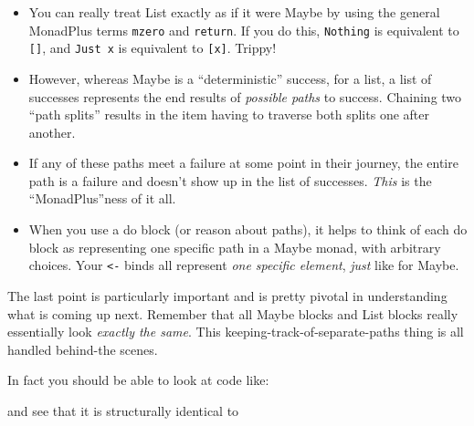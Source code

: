 \documentclass[]{article}
\newenvironment{Shaded}{}{}
\newcommand{\KeywordTok}[1]{\textcolor[rgb]{0.00,0.44,0.13}{\textbf{{#1}}}}
\newcommand{\DecValTok}[1]{\textcolor[rgb]{0.25,0.63,0.44}{{#1}}}
\newcommand{\OtherTok}[1]{\textcolor[rgb]{0.00,0.44,0.13}{{#1}}}
\newcommand{\FunctionTok}[1]{\textcolor[rgb]{0.02,0.16,0.49}{{#1}}}
\newcommand{\NormalTok}[1]{{#1}}
\begin{document}
\begin{itemize}
\tightlist
\item
  You can really treat List exactly as if it were Maybe by using the general MonadPlus terms
  \texttt{mzero} and \texttt{return}. If you do this, \texttt{Nothing} is equivalent to
  \texttt{{[}{]}}, and \texttt{Just\ x} is equivalent to \texttt{{[}x{]}}. Trippy!
\item
  However, whereas Maybe is a ``deterministic'' success, for a list, a list of successes represents
  the end results of \emph{possible paths} to success. Chaining two ``path splits'' results in the
  item having to traverse both splits one after another.
\item
  If any of these paths meet a failure at some point in their journey, the entire path is a failure
  and doesn't show up in the list of successes. \emph{This} is the ``MonadPlus''ness of it all.
\item
  When you use a do block (or reason about paths), it helps to think of each do block as
  representing one specific path in a Maybe monad, with arbitrary choices. Your
  \texttt{\textless{}-} binds all represent \emph{one specific element}, \emph{just} like for Maybe.
\end{itemize}

The last point is particularly important and is pretty pivotal in understanding what is coming up
next. Remember that all Maybe blocks and List blocks really essentially look \emph{exactly the
same}. This keeping-track-of-separate-paths thing is all handled behind-the scenes.

In fact you should be able to look at code like:

\begin{Shaded}
\end{Shaded}

and see that it is structurally identical to
\end{document}
